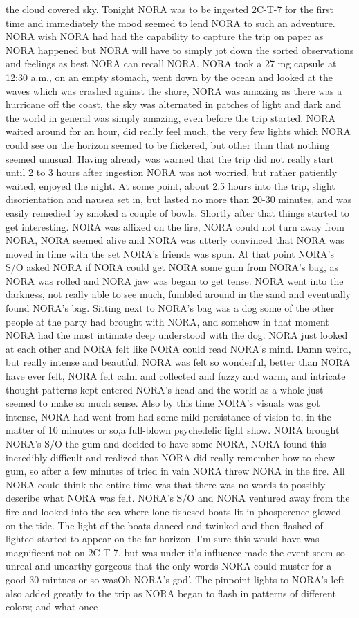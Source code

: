 \documentclass[12pt]{book}
\begin{document}
the cloud covered sky. Tonight NORA was to be ingested 2C-T-7 for the first time and immediately the mood seemed to lend NORA to such an adventure. NORA wish NORA had had the capability to capture the trip on paper as NORA happened but NORA will have to simply jot down the sorted observations and feelings as best NORA can recall NORA. NORA took a 27 mg capsule at 12:30 a.m., on an empty stomach, went down by the ocean and looked at the waves which was crashed against the shore, NORA was amazing as there was a hurricane off the coast, the sky was alternated in patches of light and dark and the world in general was simply amazing, even before the trip started. NORA waited around for an hour, did really feel much, the very few lights which NORA could see on the horizon seemed to be flickered, but other than that nothing seemed unusual. Having already was warned that the trip did not really start until 2 to 3 hours after ingestion NORA was not worried, but rather patiently waited, enjoyed the night. At some point, about 2.5 hours into the trip, slight disorientation and nausea set in, but lasted no more than 20-30 minutes, and was easily remedied by smoked a couple of bowls. Shortly after that things started to get interesting. NORA was affixed on the fire, NORA could not turn away from NORA, NORA seemed alive and NORA was utterly convinced that NORA was moved in time with the set NORA's friends was spun. At that point NORA's S/O asked NORA if NORA could get NORA some gum from NORA's bag, as NORA was rolled and NORA jaw was began to get tense. NORA went into the darkness, not really able to see much, fumbled around in the sand and eventually found NORA's bag. Sitting next to NORA's bag was a dog some of the other people at the party had brought with NORA, and somehow in that moment NORA had the most intimate deep understood with the dog. NORA just looked at each other and NORA felt like NORA could read NORA's mind. Damn weird, but really intense and beautful. NORA was felt so wonderful, better than NORA have ever felt, NORA felt calm and collected and fuzzy and warm, and intricate thought patterns kept entered NORA's head and the world as a whole just seemed to make so much sense. Also by this time NORA's visuals was got intense, NORA had went from had some mild persistance of vision to, in the matter of 10 minutes or so,a full-blown psychedelic light show. NORA brought NORA's S/O the gum and decided to have some NORA, NORA found this incredibly difficult and realized that NORA did really remember how to chew gum, so after a few minutes of tried in vain NORA threw NORA in the fire. All NORA could think the entire time was that there was no words to possibly describe what NORA was felt. NORA's S/O and NORA ventured away from the fire and looked into the sea where lone fishesed boats lit in phosperence glowed on the tide. The light of the boats danced and twinked and then flashed of lighted started to appear on the far horizon. I'm sure this would have was magnificent not on 2C-T-7, but was under it's influence made the event seem so unreal and unearthy gorgeous that the only words NORA could muster for a good 30 mintues or so wasOh NORA's god'. The pinpoint lights to NORA's left also added greatly to the trip as NORA began to flash in patterns of different colors; and what once 
\end{document}
